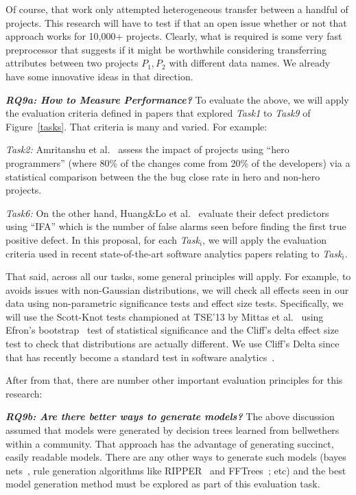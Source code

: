 Of course, that work only attempted heterogeneous transfer between a handful of projects.
This research will have to test if that an open issue whether or not that approach
works for 10,000+ projects.
Clearly, what is required is some very fast preprocessor that suggests 
if it might be worthwhile considering transferring attributes between
two projects $P_1,P_2$ with different data names. We already have some innovative ideas in that direction.




\textit{\textbf{ RQ9a: How to Measure Performance? }}To evaluate the above, we will apply the evaluation criteria defined in papers that explored {\em Task1} to {\em Task9} of Figure~\ref{tasks}. That
criteria is many and varied. For example:
\bi
\item
{\em Task2:} Amritanshu et al.~\cite{agrawal17hero}   assess the impact of projects using   ``hero programmers'' (where 80\% of the changes come from 20\% of the developers) via a statistical
comparison between the   
the bug close rate in hero and non-hero projects. 
\item
{\em Task6:} On the other hand, Huang\&Lo et al.~\cite{huang} evaluate their defect predictors   using ``IFA'' which is the number of false alarms seen before finding the first true positive defect.
\ei
In this proposal, for each {\em Task$_i$}, 
we will apply the  evaluation criteria used in recent state-of-the-art software analytics papers relating to {\em Task$_i$}.

That said, across all our tasks, some general principles will apply.
For example, 
to avoids issues with non-Gaussian
distributions, we will check all effects seen in our data using
 non-parametric significance tests and effect size tests. Specifically,
 we will use the Scott-Knot tests championed at TSE'13 by 
 Mittas et al.~\cite{Mittas13} using Efron's bootstrap~\cite{efron93} test of statistical significance and the Cliff's
delta effect size test to check that distributions are actually different. We use Cliff's Delta since that has
recently become a standard test in software analytics~\cite{Gh15}.

After from that, there are number other important evaluation principles for this research:

\textit{\textbf{RQ9b: Are there better ways to generate models?}} %
The above discussion assumed that models were generated by decision trees learned from bellwethers within a community. That approach has the advantage of generating succinct, easily readable models.  There are any other ways to generate such models (bayes nets~\cite{misirli2014bayesian}, 
rule generation algorithms like RIPPER~\cite{cohen1999simple} and FFTrees~\cite{chen2018applications}; etc) and the best model generation method
must be explored as part of this evaluation task.


